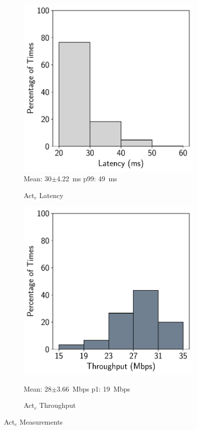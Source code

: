\begin{figure}[htbp]
    \centering
    \begin{subfigure}[t]{0.45\textwidth}
    \centering
    \includegraphics[width = .8\textwidth]{figs/act-e-latency.pdf}\\
    \small{Mean: 30$\pm$4.22~ms\; p99: 49~ms}\\
    \caption{Act$_{e}$ Latency}
    \label{fig:act-e-latency}
\end{subfigure}
\begin{subfigure}[t]{0.45\textwidth}
    \centerline{\includegraphics[width = .8\textwidth]{figs/act-e-throughput.pdf}}
    \centering
    \small{Mean: 28$\pm$3.66~Mbps\; p1: 19~Mbps}\\
    \caption{Act$_{e}$ Throughput}
    \label{fig:act-e-throughput}
\end{subfigure}
    \caption{Act$_{e}$ Measurements}
    \label{fig:act_e_measurements}
\end{figure}

